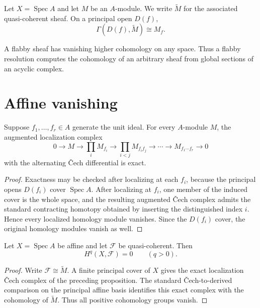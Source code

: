 \begin{definition}\label{def:vi49-affine-qc}
Let $X=\operatorname{Spec}A$ and let $M$ be an $A$-module. We write $\widetilde M$ for the associated quasi-coherent sheaf. On a principal open $D(f)$,
\[
\Gamma(D(f),\widetilde M)\cong M_f.
\]
\end{definition}

\begin{example}\label{ex:vi49-expand-02}
A flabby sheaf has vanishing higher cohomology on any space.  Thus a flabby resolution computes the cohomology of an arbitrary sheaf from global sections of an acyclic complex.
\end{example}
\section{Affine vanishing}

\begin{proposition}\label{prop:vi49-localization-cech}
Suppose $f_1,\ldots,f_r\in A$ generate the unit ideal. For every $A$-module $M$, the augmented localization complex
\[
0\to M\to\prod_i M_{f_i}\to\prod_{i<j}M_{f_if_j}\to\cdots\to M_{f_1\cdots f_r}\to0
\]
with the alternating Čech differential is exact.
\begin{proof}
Exactness may be checked after localizing at each $f_i$, because the principal opens $D(f_i)$ cover $\operatorname{Spec}A$. After localizing at $f_i$, one member of the induced cover is the whole space, and the resulting augmented Čech complex admits the standard contracting homotopy obtained by inserting the distinguished index $i$. Hence every localized homology module vanishes. Since the $D(f_i)$ cover, the original homology modules vanish as well.
\end{proof}
\end{proposition}


\begin{theorem}\label{thm:vi49-affine-vanishing}
Let $X=\operatorname{Spec}A$ be affine and let $\mathcal F$ be quasi-coherent. Then
\[
\boxed{H^q(X,\mathcal F)=0\qquad(q>0).}
\]
\begin{proof}
Write $\mathcal F\cong\widetilde M$. A finite principal cover of $X$ gives the exact localization Čech complex of the preceding proposition. The standard Čech-to-derived comparison on the principal affine basis identifies this exact complex with the cohomology of $\widetilde M$. Thus all positive cohomology groups vanish.
\end{proof}
\end{theorem}

